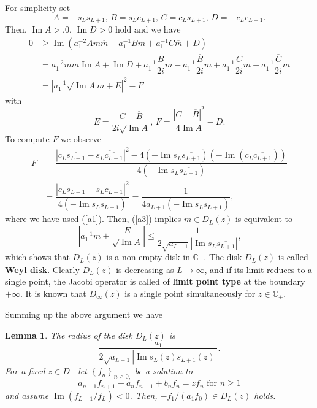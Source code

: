 \documentclass[a4paper]{article}%
\newtheorem{lemma}{Lemma}
\begin{document}
For simplicity set%
\[
A=-s_{L}\overline{s_{L+1}}\text{, \ }B=s_{L}\overline{c_{L+1}}\text{,
\ }C=c_{L}\overline{s_{L+1}}\text{, \ }D=-c_{L}\overline{c_{L+1}}\text{.}%
\]
Then, $\operatorname{Im}A>.0$, $\operatorname{Im}D>0$ hold and we have%
\begin{align*}
0  &  \geq\operatorname{Im}\left(  a_{1}^{-2}Am\overline{m}+a_{1}^{-1}%
Bm+a_{1}^{-1}C\overline{m}+D\right) \\
&  =a_{1}^{-2}m\overline{m}\operatorname{Im}A+\operatorname{Im}D+a_{1}%
^{-1}\dfrac{B}{2i}m-a_{1}^{-1}\dfrac{\overline{B}}{2i}\overline{m}+a_{1}%
^{-1}\dfrac{C}{2i}\overline{m}-a_{1}^{-1}\dfrac{\overline{C}}{2i}m\\
&  =\left\vert a_{1}^{-1}\sqrt{\operatorname{Im}A}m+E\right\vert ^{2}-F
\end{align*}
with%
\[
E=\dfrac{C-\overline{B}}{2i\sqrt{\operatorname{Im}A}}\text{, \ \ \ }%
F=\dfrac{\left\vert C-\overline{B}\right\vert ^{2}}{4\operatorname{Im}%
A}-D\text{.}%
\]
To compute $F$ we observe%
\begin{align*}
F  &  =\dfrac{\left\vert c_{L}\overline{s_{L+1}}-\overline{s_{L}%
\overline{c_{L+1}}}\right\vert ^{2}-4\left(  -\operatorname{Im}s_{L}%
\overline{s_{L+1}}\right)  \left(  -\operatorname{Im}\left(  c_{L}%
\overline{c_{L+1}}\right)  \right)  }{4\left(  -\operatorname{Im}%
s_{L}\overline{s_{L+1}}\right)  }\\
&  =\dfrac{\left\vert c_{L}s_{L+1}-s_{L}c_{L+1}\right\vert ^{2}}{4\left(
-\operatorname{Im}s_{L}\overline{s_{L+1}}\right)  }=\dfrac{1}{4a_{L+1}\left(
-\operatorname{Im}s_{L}\overline{s_{L+1}}\right)  }\text{,}%
\end{align*}
where we have used (\ref{a1}). Then, (\ref{a3}) implies $m\in D_{L}(z)$ is
equivalent to%
\begin{equation}
\left\vert a_{1}^{-1}m+\dfrac{E}{\sqrt{\operatorname{Im}A}}\right\vert
\leq\dfrac{1}{2\sqrt{a_{L+1}}\left\vert \operatorname{Im}s_{L}\overline
{s_{L+1}}\right\vert }\text{,} \label{a4}%
\end{equation}
which shows that $D_{L}(z)$ is a non-empty disk in $\mathbb{C}_{+}$. The disk
$D_{L}(z)$ is called \textbf{Weyl disk}. Clearly $D_{L}(z)$ is decreasing as
$L\rightarrow\infty$, and if its limit reduces to a single point, the Jacobi
operator is called of \textbf{limit point type} at the boundary $+\infty$. It
is known that $D_{\infty}(z)$ is a single point simultaneously for
$z\in\mathbb{C}_{+}$.

Summing up the above argument we have

\begin{lemma}
\label{a-1}The radius of the disk $D_{L}(z)$ is
\[
\dfrac{a_{1}}{2\sqrt{a_{L+1}}\left\vert \operatorname{Im}s_{L}\left(
z\right)  \overline{s_{L+1}\left(  z\right)  }\right\vert }\text{.}%
\]
For a fixed $z\in D_{+}$ let $\left\{  f_{n}\right\}  _{n\geq0,}$ be a
solution to%
\[
a_{n+1}f_{n+1}+a_{n}f_{n-1}+b_{n}f_{n}=zf_{n}\text{ \ for }n\geq1
\]
and assume $\operatorname{Im}\left(  f_{L+1}/f_{L}\right)  <0$. Then,
$-f_{1}/\left(  a_{1}f_{0}\right)  \in D_{L}(z)$ holds.
\end{lemma}
\end{document}
